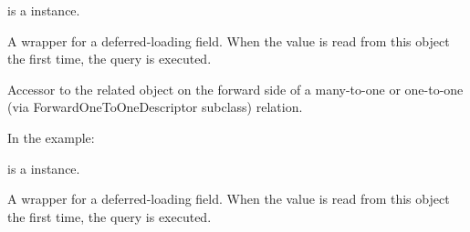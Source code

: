 \documentclass[letterpaper,10pt,english]{sphinxmanual}
\begin{document}
\begin{fulllineitems}
\begin{fulllineitems}
 is a  instance.

\end{fulllineitems}


\begin{fulllineitems}
\label{\detokenize{QuChemPedIA.models:QuChemPedIA.models.ImportFileModels.ImportFile.id_user_id}}
A wrapper for a deferred-loading field. When the value is read from this
object the first time, the query is executed.

\end{fulllineitems}


\begin{fulllineitems}
\label{\detokenize{QuChemPedIA.models:QuChemPedIA.models.ImportFileModels.ImportFile.id_version}}
Accessor to the related object on the forward side of a many-to-one or
one-to-one (via ForwardOneToOneDescriptor subclass) relation.

In the example:

%
\begin{sphinxVerbatim}[commandchars=\\\{\}]
 
       
\end{sphinxVerbatim}

 is a  instance.

\end{fulllineitems}


\begin{fulllineitems}
\label{\detokenize{QuChemPedIA.models:QuChemPedIA.models.ImportFileModels.ImportFile.id_version_id}}
A wrapper for a deferred-loading field. When the value is read from this
object the first time, the query is executed.


\end{fulllineitems}
\end{fulllineitems}
\end{document}
